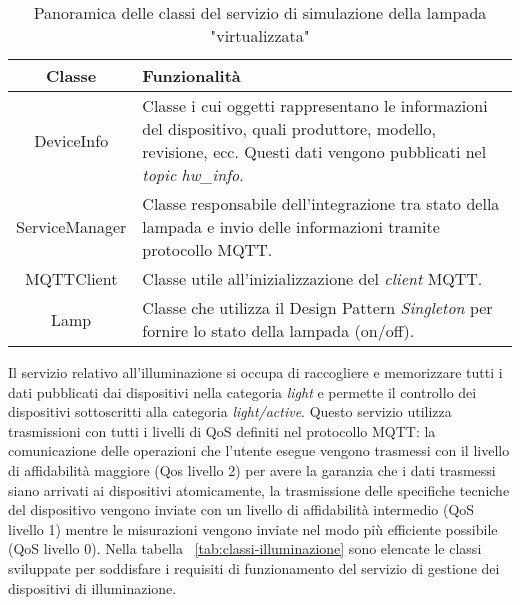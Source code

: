 
\begin{table}[!h]
\caption{Panoramica delle classi del servizio di simulazione della lampada "virtualizzata"}
\label{tab:classi-lampada}
\begin{tabularx}{\linewidth}{|c|X|}
\hline
\textbf{Classe} & \textbf{Funzionalità} \\
\hline
DeviceInfo & Classe i cui oggetti rappresentano le informazioni del dispositivo, quali produttore, modello, revisione, ecc. Questi dati vengono pubblicati nel \emph{topic} \emph{hw\_info}. \\
\hline
ServiceManager & Classe responsabile dell'integrazione tra stato della lampada e invio delle informazioni tramite protocollo MQTT. \\
\hline
MQTTClient & Classe utile all'inizializzazione del \emph{client} MQTT. \\
\hline
Lamp & Classe che utilizza il Design Pattern \emph{Singleton} per fornire lo stato della lampada (on/off). \\
\hline
\end{tabularx}
\end{table}


Il servizio relativo all'illuminazione si occupa di raccogliere e memorizzare tutti i dati pubblicati dai dispositivi nella categoria \emph{light} e permette il controllo dei dispositivi sottoscritti alla categoria \emph{light/active}.
Questo servizio utilizza trasmissioni con tutti i livelli di QoS definiti nel protocollo MQTT: la comunicazione delle operazioni che l'utente esegue vengono trasmessi con il livello di affidabilità maggiore (Qos livello 2) per avere la garanzia che i dati trasmessi siano arrivati ai dispositivi atomicamente, la trasmissione delle specifiche tecniche del dispositivo vengono inviate con un livello di affidabilità intermedio (QoS livello 1) mentre le misurazioni vengono inviate nel modo più efficiente possibile (QoS livello 0).
Nella tabella ~\ref{tab:classi-illuminazione} sono elencate le classi sviluppate per soddisfare i requisiti di funzionamento del servizio di gestione dei dispositivi di illuminazione.

